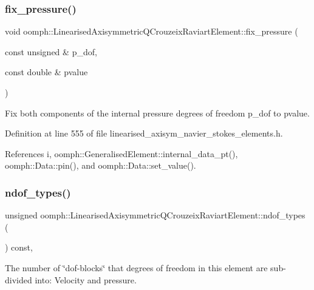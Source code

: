 \subsubsection{\texorpdfstring{fix\+\_\+pressure()}{fix\_pressure()}}
{\footnotesize\ttfamily void oomph\+::\+Linearised\+Axisymmetric\+Q\+Crouzeix\+Raviart\+Element\+::fix\+\_\+pressure (\begin{DoxyParamCaption}\item[{const unsigned \&}]{p\+\_\+dof,  }\item[{const double \&}]{pvalue }\end{DoxyParamCaption})\hspace{0.3cm}{\ttfamily [inline]}}



Fix both components of the internal pressure degrees of freedom p\+\_\+dof to pvalue. 



Definition at line 555 of file linearised\+\_\+axisym\+\_\+navier\+\_\+stokes\+\_\+elements.\+h.



References i, oomph\+::\+Generalised\+Element\+::internal\+\_\+data\+\_\+pt(), oomph\+::\+Data\+::pin(), and oomph\+::\+Data\+::set\+\_\+value().

\mbox{\label{classoomph_1_1LinearisedAxisymmetricQCrouzeixRaviartElement_a3626eb04e30bef2ff695cb6c58dc59ba}} 
\subsubsection{\texorpdfstring{ndof\+\_\+types()}{ndof\_types()}}
{\footnotesize\ttfamily unsigned oomph\+::\+Linearised\+Axisymmetric\+Q\+Crouzeix\+Raviart\+Element\+::ndof\+\_\+types (\begin{DoxyParamCaption}{ }\end{DoxyParamCaption}) const\hspace{0.3cm}{\ttfamily [inline]}, {\ttfamily [virtual]}}



The number of \char`\"{}dof-\/blocks\char`\"{} that degrees of freedom in this element are sub-\/divided into\+: Velocity and pressure. 



